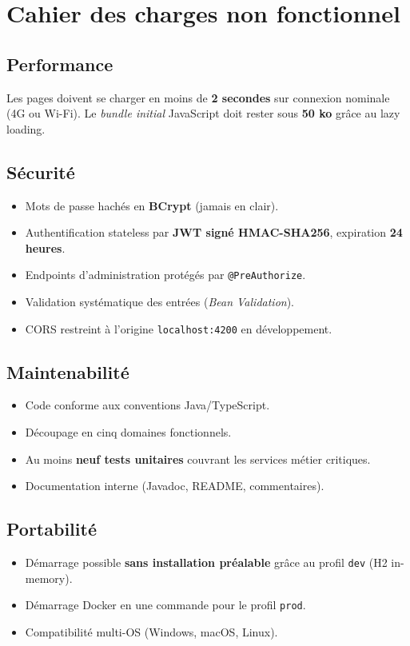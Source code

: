 \documentclass[11pt,a4paper,oneside]{report}
\begin{document}
\section{Cahier des charges non fonctionnel}

\subsection{Performance}
Les pages doivent se charger en moins de \textbf{2 secondes} sur connexion
nominale (4G ou Wi-Fi). Le \textit{bundle initial} JavaScript doit rester
sous \textbf{50 ko} grâce au lazy loading.

\subsection{Sécurité}
\begin{itemize}
  \item Mots de passe hachés en \textbf{BCrypt} (jamais en clair).
  \item Authentification stateless par \textbf{JWT signé HMAC-SHA256},
    expiration \textbf{24 heures}.
  \item Endpoints d'administration protégés par \texttt{@PreAuthorize}.
  \item Validation systématique des entrées (\textit{Bean Validation}).
  \item CORS restreint à l'origine \texttt{localhost:4200} en développement.
\end{itemize}

\subsection{Maintenabilité}
\begin{itemize}
  \item Code conforme aux conventions Java/TypeScript.
  \item Découpage en cinq domaines fonctionnels.
  \item Au moins \textbf{neuf tests unitaires} couvrant les services métier
    critiques.
  \item Documentation interne (Javadoc, README, commentaires).
\end{itemize}

\subsection{Portabilité}
\begin{itemize}
  \item Démarrage possible \textbf{sans installation préalable} grâce au
    profil \texttt{dev} (H2 in-memory).
  \item Démarrage Docker en une commande pour le profil \texttt{prod}.
  \item Compatibilité multi-OS (Windows, macOS, Linux).
\end{itemize}
\end{document}
